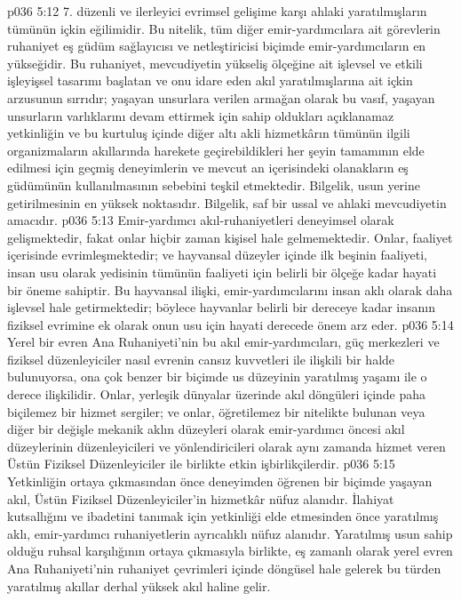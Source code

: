 \vs p036 5:12 7.\bibnobreakspace {} düzenli ve ilerleyici evrimsel gelişime karşı ahlaki yaratılmışların tümünün içkin eğilimidir. Bu nitelik, tüm diğer emir\hyp{}yardımcılara ait görevlerin ruhaniyet eş güdüm sağlayıcısı ve netleştiricisi biçimde emir\hyp{}yardımcıların en yükseğidir. Bu ruhaniyet, mevcudiyetin yükseliş ölçeğine ait işlevsel ve etkili işleyişsel tasarımı başlatan ve onu idare eden akıl yaratılmışlarına ait içkin arzusunun sırrıdır; yaşayan unsurlara verilen armağan olarak bu vasıf, yaşayan unsurların varlıklarını devam ettirmek için sahip oldukları açıklanamaz yetkinliğin ve bu kurtuluş içinde diğer altı akli hizmetkârın tümünün ilgili organizmaların akıllarında harekete geçirebildikleri her şeyin tamamının elde edilmesi için geçmiş deneyimlerin ve mevcut an içerisindeki olanakların eş güdümünün kullanılmasının sebebini teşkil etmektedir. Bilgelik, usun yerine getirilmesinin en yüksek noktasıdır. Bilgelik, saf bir ussal ve ahlaki mevcudiyetin amacıdır.
\vs p036 5:13 Emir\hyp{}yardımcı akıl\hyp{}ruhaniyetleri deneyimsel olarak gelişmektedir, fakat onlar hiçbir zaman kişisel hale gelmemektedir. Onlar, faaliyet içerisinde evrimleşmektedir; ve hayvansal düzeyler içinde ilk beşinin faaliyeti, insan usu olarak yedisinin tümünün faaliyeti için belirli bir ölçeğe kadar hayati bir öneme sahiptir. Bu hayvansal ilişki, emir\hyp{}yardımcılarını insan aklı olarak daha işlevsel hale getirmektedir; böylece hayvanlar belirli bir dereceye kadar insanın fiziksel evrimine ek olarak onun usu için hayati derecede önem arz eder.
\vs p036 5:14 Yerel bir evren Ana Ruhaniyeti’nin bu akıl emir\hyp{}yardımcıları, güç merkezleri ve fiziksel düzenleyiciler nasıl evrenin cansız kuvvetleri ile ilişkili bir halde bulunuyorsa, ona çok benzer bir biçimde us düzeyinin yaratılmış yaşamı ile o derece ilişkilidir. Onlar, yerleşik dünyalar üzerinde akıl döngüleri içinde paha biçilemez bir hizmet sergiler; ve onlar, öğretilemez bir nitelikte bulunan veya diğer bir değişle mekanik aklın düzeyleri olarak emir\hyp{}yardımcı öncesi akıl düzeylerinin düzenleyicileri ve yönlendiricileri olarak aynı zamanda hizmet veren Üstün Fiziksel Düzenleyiciler ile birlikte etkin işbirlikçilerdir.
\vs p036 5:15 Yetkinliğin ortaya çıkmasından önce deneyimden öğrenen bir biçimde yaşayan akıl, Üstün Fiziksel Düzenleyiciler’in hizmetkâr nüfuz alanıdır. İlahiyat kutsallığını ve ibadetini tanımak için yetkinliği elde etmesinden önce yaratılmış aklı, emir\hyp{}yardımcı ruhaniyetlerin ayrıcalıklı nüfuz alanıdır. Yaratılmış usun sahip olduğu ruhsal karşılığının ortaya çıkmasıyla birlikte, eş zamanlı olarak yerel evren Ana Ruhaniyeti’nin ruhaniyet çevrimleri içinde döngüsel hale gelerek bu türden yaratılmış akıllar derhal yüksek akıl haline gelir.
